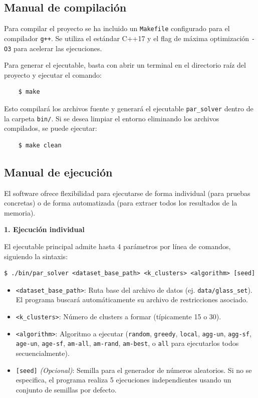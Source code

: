 \documentclass[a4paper,12pt]{article}%
\begin{document}
\subsection{Manual de compilación}

\noindent Para compilar el proyecto se ha incluido un \texttt{Makefile} configurado para el compilador \texttt{g++}. Se utiliza el estándar C++17 y el flag de máxima optimización \texttt{-O3} para acelerar las ejecuciones.

Para generar el ejecutable, basta con abrir un terminal en el directorio raíz del proyecto y ejecutar el comando:
\begin{verbatim}
	$ make
\end{verbatim}

Esto compilará los archivos fuente y generará el ejecutable \texttt{par\_solver} dentro de la carpeta \texttt{bin/}. Si se desea limpiar el entorno eliminando los archivos compilados, se puede ejecutar:
\begin{verbatim}
	$ make clean
\end{verbatim}

\subsection{Manual de ejecución}

\noindent El software ofrece flexibilidad para ejecutarse de forma individual (para pruebas concretas) o de forma automatizada (para extraer todos los resultados de la memoria).

\vspace{0.3cm}
\noindent\textbf{1. Ejecución individual}

El ejecutable principal admite hasta 4 parámetros por línea de comandos, siguiendo la sintaxis:
\begin{small}
\begin{verbatim}
$ ./bin/par_solver <dataset_base_path> <k_clusters> <algorithm> [seed]
\end{verbatim}
\end{small}


\begin{itemize}
	\item \texttt{<dataset\_base\_path>}: Ruta base del archivo de datos (ej. \texttt{data/glass\_set}). El programa buscará automáticamente su archivo de restricciones asociado.
	\item \texttt{<k\_clusters>}: Número de clusters a formar (típicamente 15 o 30).
	\item \texttt{<algorithm>}: Algoritmo a ejecutar (\texttt{random}, \texttt{greedy}, \texttt{local}, \texttt{agg-un}, \texttt{agg-sf}, \texttt{age-un}, \texttt{age-sf}, \texttt{am-all}, \texttt{am-rand}, \texttt{am-best}, o \texttt{all} para ejecutarlos todos secuencialmente).
	\item \texttt{[seed]} \textit{(Opcional)}: Semilla para el generador de números aleatorios. Si no se especifica, el programa realiza 5 ejecuciones independientes usando un conjunto de semillas por defecto.
\end{itemize}
\end{document}
